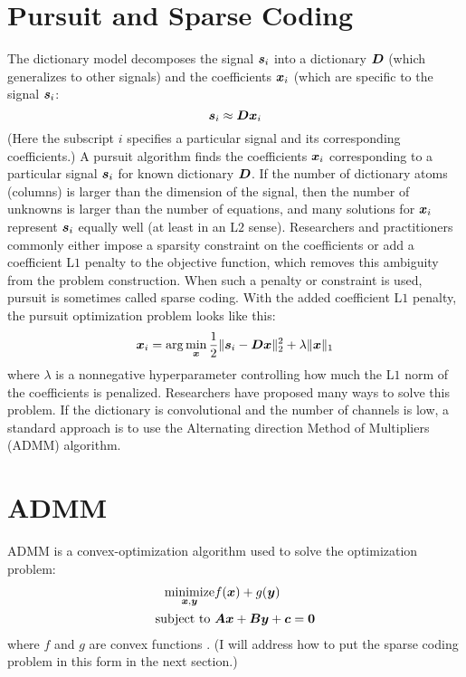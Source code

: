 \section{Pursuit and Sparse Coding}
\label{section:sparse coding}
The dictionary model decomposes the signal $\bm{s}_i$ into a dictionary $\bm{D}$ (which generalizes to other signals) and the coefficients $\bm{x}_i$ (which are specific to the signal $\bm{s}_i$:
%
\begin{equation}
\bm{s}_i \approx \bm{D}\bm{x}_i
\end{equation}
%
(Here the subscript $i$ specifies a particular signal and its corresponding coefficients.) A pursuit algorithm finds the coefficients $\bm{x}_i$ corresponding to a particular signal $\bm{s}_i$ for known dictionary $\bm{D}$. If the number of dictionary atoms (columns) is larger than the dimension of the signal, then the number of unknowns is larger than the number of equations, and many solutions for $\bm{x}_i$ represent $\bm{s}_i$ equally well (at least in an L$2$ sense). Researchers and practitioners commonly either impose a sparsity constraint on the coefficients or add a coefficient L$1$ penalty to the objective function, which removes this ambiguity from the problem construction. When such a penalty or constraint is used, pursuit is sometimes called sparse coding. With the added coefficient L$1$ penalty, the pursuit optimization problem looks like this:
%
\begin{equation}\label{equation:sparse coding}
\bm{x}_i = \arg\min_{\bm{x}} \frac{1}{2}\|\bm{s}_i - \bm{D}\bm{x}\|_2^2 + \lambda \|\bm{x}\|_1
\end{equation}
%
where $\lambda$ is a nonnegative hyperparameter controlling how much the L$1$ norm of the coefficients is penalized. Researchers have proposed many ways to solve this problem. If the dictionary is convolutional and the number of channels is low, a standard approach is to use the Alternating direction Method of Multipliers (ADMM) algorithm.

\section{ADMM}
\label{section:ADMM}
ADMM is a convex-optimization algorithm used to solve the optimization problem:
\begin{equation} \label{equation:ADMM}
\begin{aligned}
\operatorname*{\text{minimize}}_{\bm{x},\bm{y}} & f(\bm{x}) + g(\bm{y}) \\
\text{subject to } & \bm{A}\bm{x} + \bm{B}\bm{y} + \bm{c} = \bm{0} 
\end{aligned}
\end{equation}
%
where $f$ and $g$ are convex functions \cite{boyd2011distributed}. (I will address how to put the sparse coding problem in this form in the next section.)

